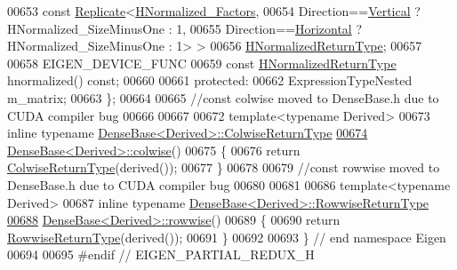 \begin{DoxyCode}
00653                 \textcolor{keyword}{const} \hyperlink{group___core___module_class_eigen_1_1_replicate}{Replicate}<\hyperlink{group___core___module_class_eigen_1_1_block}{HNormalized\_Factors},
00654                   Direction==\hyperlink{group__enums_ggad49a7b3738e273eb00932271b36127f7addca718e0564723df21d61b94b1198be}{Vertical}   ? HNormalized\_SizeMinusOne : 1,
00655                   Direction==\hyperlink{group__enums_ggad49a7b3738e273eb00932271b36127f7aae8a16b3b9272683c1162915f6d892be}{Horizontal} ? HNormalized\_SizeMinusOne : 1> >
00656             \hyperlink{group___core___module_class_eigen_1_1_cwise_binary_op}{HNormalizedReturnType};
00657 
00658     EIGEN\_DEVICE\_FUNC
00659     \textcolor{keyword}{const} \hyperlink{group___core___module_class_eigen_1_1_cwise_binary_op}{HNormalizedReturnType} hnormalized() \textcolor{keyword}{const};
00660 
00661   \textcolor{keyword}{protected}:
00662     ExpressionTypeNested m\_matrix;
00663 \};
00664 
00665 \textcolor{comment}{//const colwise moved to DenseBase.h due to CUDA compiler bug}
00666 
00667 
00672 \textcolor{keyword}{template}<\textcolor{keyword}{typename} Derived>
00673 \textcolor{keyword}{inline} \textcolor{keyword}{typename} \hyperlink{group___core___module_class_eigen_1_1_vectorwise_op}{DenseBase<Derived>::ColwiseReturnType}
\hyperlink{group___core___module_a1c0e1b6067ec1de6cb8799da55aa7d30}{00674} \hyperlink{group___core___module_a978724c07b70cb9b8fdef67a4de08788}{DenseBase<Derived>::colwise}()
00675 \{
00676   \textcolor{keywordflow}{return} \hyperlink{group___core___module_class_eigen_1_1_vectorwise_op}{ColwiseReturnType}(derived());
00677 \}
00678 
00679 \textcolor{comment}{//const rowwise moved to DenseBase.h due to CUDA compiler bug}
00680 
00681 
00686 \textcolor{keyword}{template}<\textcolor{keyword}{typename} Derived>
00687 \textcolor{keyword}{inline} \textcolor{keyword}{typename} \hyperlink{group___core___module_class_eigen_1_1_vectorwise_op}{DenseBase<Derived>::RowwiseReturnType}
\hyperlink{group___core___module_a6daa3a3156ca0e0722bf78638e1c7f28}{00688} \hyperlink{group___core___module_af9662cd704ffc16c5b88c7b2d331576f}{DenseBase<Derived>::rowwise}()
00689 \{
00690   \textcolor{keywordflow}{return} \hyperlink{group___core___module_class_eigen_1_1_vectorwise_op}{RowwiseReturnType}(derived());
00691 \}
00692 
00693 \} \textcolor{comment}{// end namespace Eigen}
00694 
00695 \textcolor{preprocessor}{#endif // EIGEN\_PARTIAL\_REDUX\_H}
\end{DoxyCode}
